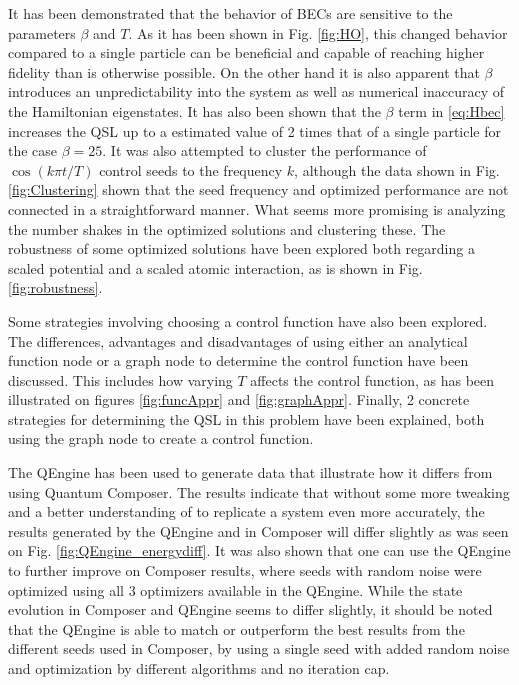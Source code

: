 \documentclass[a4paper, twocolumn]{revtex4-1}
\begin{document}
It has been demonstrated that the behavior of BECs are sensitive to the parameters $\beta$ and $T$. As it has been shown in Fig. \ref{fig:HO}, this changed behavior compared to a single particle can be beneficial and capable of reaching higher fidelity than is otherwise possible. On the other hand it is also apparent that $\beta$ introduces an unpredictability into the system as well as numerical inaccuracy of the Hamiltonian eigenstates. It has also been shown that the $\beta$ term in \eqref{eq:Hbec} increases the QSL up to a estimated value of 2 times that of a single particle for the case $\beta=25$. It was also attempted to cluster the performance of $\cos(k\pi t/T)$ control seeds to the frequency $k$, although the data shown in Fig. \ref{fig:Clustering} shown that the seed frequency and optimized performance are not connected in a straightforward manner. What seems more promising is analyzing the number shakes in the optimized solutions and clustering these. The robustness of some optimized solutions have been explored both regarding a scaled potential and a scaled atomic interaction, as is shown in Fig. \ref{fig:robustness}.

Some strategies involving choosing a control function have also been explored. The differences, advantages and disadvantages of using either an analytical function node or a graph node to determine the control function have been discussed. This includes how varying $T$ affects the control function, as has been illustrated on figures \ref{fig:funcAppr} and \ref{fig:graphAppr}. Finally, 2 concrete strategies for determining the QSL in this problem have been explained, both using the graph node to create a control function.

The QEngine has been used to generate data that illustrate how it differs from using Quantum Composer. The results indicate that without some more tweaking and a better understanding of to replicate a system even more accurately, the results generated by the QEngine and in Composer will differ slightly as was seen on Fig. \ref{fig:QEngine_energydiff}. It was also shown that one can use the QEngine to further improve on Composer results, where seeds with random noise were optimized using all 3 optimizers available in the QEngine. While the state evolution in Composer and QEngine seems to differ slightly, it should be noted that the QEngine is able to match or outperform the best results from the different seeds used in Composer, by using a single seed with added random noise and optimization by different algorithms and no iteration cap.
\end{document}
